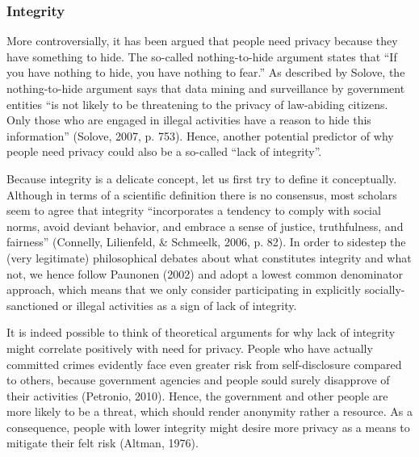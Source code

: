 \documentclass[man,floatsintext]{apa6}
\begin{document}
\hypertarget{integrity}{%
\subsubsection{Integrity}\label{integrity}}

More controversially, it has been argued that people need privacy because they have something to hide. The so-called nothing-to-hide argument states that \enquote{If you have nothing to hide, you have nothing to fear.} As described by Solove, the nothing-to-hide argument says that data mining and surveillance by government entities \enquote{is not likely to be threatening to the privacy of law-abiding citizens. Only those who are engaged in illegal activities have a reason to hide this information} (Solove, 2007, p. 753). Hence, another potential predictor of why people need privacy could also be a so-called \enquote{lack of integrity}.

Because integrity is a delicate concept, let us first try to define it conceptually. Although in terms of a scientific definition there is no consensus, most scholars seem to agree that integrity \enquote{incorporates a tendency to comply with social norms, avoid deviant behavior, and embrace a sense of justice, truthfulness, and fairness} (Connelly, Lilienfeld, \& Schmeelk, 2006, p. 82). In order to sidestep the (very legitimate) philosophical debates about what constitutes integrity and what not, we hence follow Paunonen (2002) and adopt a lowest common denominator approach, which means that we only consider participating in explicitly socially-sanctioned or illegal activities as a sign of lack of integrity.

It is indeed possible to think of theoretical arguments for why lack of integrity might correlate positively with need for privacy. People who have actually committed crimes evidently face even greater risk from self-disclosure compared to others, because government agencies and people sould surely disapprove of their activities (Petronio, 2010). Hence, the government and other people are more likely to be a threat, which should render anonymity rather a resource. As a consequence, people with lower integrity might desire more privacy as a means to mitigate their felt risk (Altman, 1976).
\end{document}
